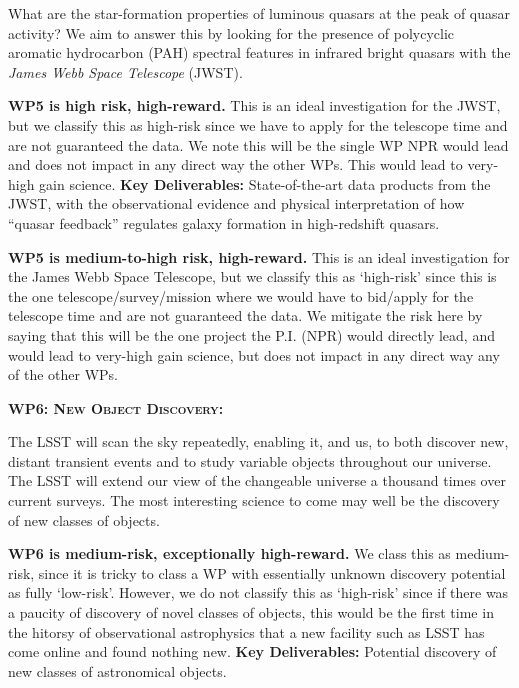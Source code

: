 \smallskip
\smallskip
\noindent
What are the star-formation properties of luminous quasars at the peak
of quasar activity?  We aim to answer this by looking for the presence
of polycyclic aromatic hydrocarbon (PAH) spectral features in infrared
bright quasars with the {\it James Webb Space Telescope} (JWST).  

\smallskip
\smallskip
\noindent
{\bf WP5 is high risk, high-reward.}  This is an ideal investigation for
the JWST, but we classify this as high-risk since we have to apply for
the telescope time and are not guaranteed the data.  We note this will
be the single WP NPR would lead and does not impact in any direct way
the other WPs. This would lead to very-high gain science.  {\bf Key
Deliverables:} State-of-the-art data products from the JWST, with the
observational evidence and physical interpretation of how ``quasar
feedback'' regulates galaxy formation in high-redshift quasars.

\smallskip
\smallskip
\noindent
{\bf WP5 is medium-to-high risk, high-reward.}
This is an ideal investigation for the James Webb Space Telescope, but we classify this as `high-risk' since this is the one telescope/survey/mission where we would have to bid/apply for the telescope time and are not guaranteed the data. We mitigate the risk here by saying that this will be the one project the P.I. (NPR) would directly lead, and would lead to very-high gain science, but does not impact in any direct way any of the other WPs. 



\medskip
\medskip
\smallskip
\smallskip
\noindent
\textbf{\textsc{WP6: New Object Discovery:}} 

\smallskip
\smallskip
\noindent
The LSST will scan the sky repeatedly, enabling it, and us, to both
discover new, distant transient events and to study variable objects
throughout our universe. The LSST will extend our view of the
changeable universe a thousand times over current surveys.  The most
interesting science to come may well be the discovery of new classes
of objects.

\smallskip
\smallskip
\noindent
{\bf WP6 is medium-risk, exceptionally high-reward.}  We class this as
medium-risk, since it is tricky to class a WP with essentially unknown
discovery potential as fully `low-risk'. However, we do not classify
this as `high-risk' since if there was a paucity of discovery of novel
classes of objects, this would be the first time in the hitorsy of
observational astrophysics that a new facility such as LSST has come
online and found nothing new.  {\bf Key Deliverables:} Potential
discovery of new classes of astronomical objects.



